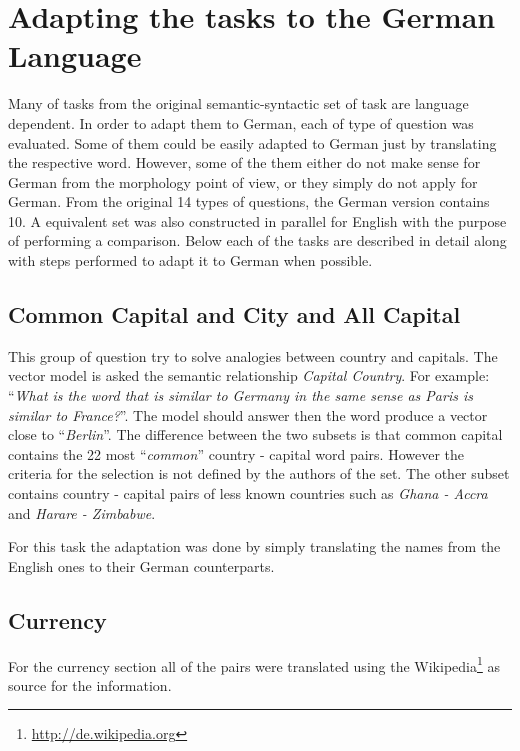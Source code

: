 \section{Adapting the tasks to the German Language}
\label{sec:adapt_task_german_lang}

Many of  tasks from the original  semantic-syntactic set of task are language
dependent. In order to adapt them  to German,  each of type  of question was
evaluated.  Some of them could  be easily adapted to German
just by translating the respective word. However, some of the them either do
not make sense for German from the morphology point of view,  or they simply do not
apply for German. From the original 14 types of questions, the German version 
contains 10. A equivalent set was also constructed in parallel for English with
the purpose of performing a comparison. Below each of the tasks are described
in detail along with steps performed to adapt it to  German when possible.

\subsection{Common Capital and City and All Capital}
\label{sec:sub_sec_common_capital_country}

This group of question try to solve analogies between country and capitals.
The vector model is asked the semantic relationship \emph{Capital Country}.
For example:  ``\emph{What is the word that is similar to
Germany in the same sense as Paris is similar to France?}''. The model should
answer then the word produce a vector close to ``\emph{Berlin}''. The
difference between the two subsets is that common capital contains
 the 22 most ``\textit{common}'' country - capital word pairs. However the
 criteria for the selection is not defined by the authors of the set. The
 other subset contains country - capital pairs of less known countries such
 as \textit{Ghana  -  Accra} and  \textit{Harare -  Zimbabwe}.

For this task the adaptation was done by simply translating the names from
the English ones to their German counterparts. 

\subsection{Currency}
\label{sec:sub_sec_currency}
For the currency section all of the pairs were translated using the Wikipedia\footnote{\url{http://de.wikipedia.org}}
as source for the information. 

